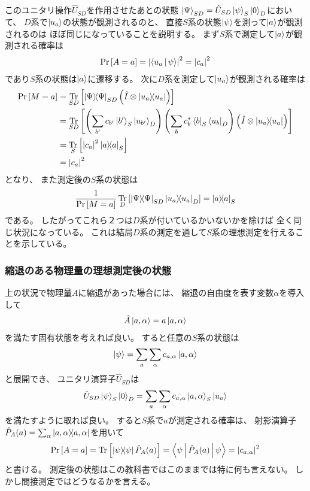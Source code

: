 \documentclass[a4paper, 10pt, uplatex]{jsarticle}
\begin{document}
このユニタリ操作$\hat{U}_{SD}$を作用させたあとの状態
$\Ket{\Psi}_{SD} = \hat{U}_{SD} \Ket{\psi}_S \Ket{0}_D$において、
$D$系で$\Ket{u_a}$の状態が観測されるのと、
直接$S$系の状態$\Ket{\psi}$を測って$\Ket{a}$が観測されるのは
ほぼ同じになっていることを説明する。
まず$S$系で測定して$\Ket{a}$が観測される確率は
\begin{align}
	\Pr \left[ A = a \right]
	= \left| \Braket{u_a | \psi} \right|^2
	= \left| c_a \right|^2
\end{align}
であり$S$系の状態は$\Ket{a}$に遷移する。
次に$D$系を測定して$\Ket{u_a}$が観測される確率は
\begin{align}
	\Pr \left[ M = a \right]
	&= \Tr_{SD} \left[ \Ketbra{\Psi}{\Psi}_{SD}
	\left( \hat{I} \otimes \Ketbra{u_a}{u_a} \right) \right] \\
	&= \Tr_{SD}
	\left[ \left( \sum_{b'} c_{b'} \Ket{b'}_S \Ket{u_{b'}}_D \right)
	\left( \sum_b c^*_b \Bra{b}_S \Bra{u_b}_D \right)
	\left( \hat{I} \otimes \Ketbra{u_a}{u_a} \right) \right] \\
	&= \Tr_S \left[ \left| c_a \right|^2 \Ketbra{a}{a}_S \right] \\
	&= \left| c_a \right|^2
\end{align}
となり、
また測定後の$S$系の状態は
\begin{align}
	\frac{1}{\Pr \left[ M = a \right]}
	\operatorname*{Tr}_D \left[ \Ket{\Psi} \! \! \Bra{\Psi}_{SD} \Ket{u_a} \! \! \Bra{u_a}_D \right]
	= \Ket{a} \! \! \Bra{a}_S
\end{align}
である。
したがってこれら２つは$D$系が付いているかいないかを除けば
全く同じ状況になっている。
これは結局$D$系の測定を通して$S$系の理想測定を行えることを示している。

\subsubsection{縮退のある物理量の理想測定後の状態}
上の状況で物理量$A$に縮退があった場合には、
縮退の自由度を表す変数$\alpha$を導入して
\begin{align}
	\hat{A} \Ket{a, \alpha} = a \Ket{a, \alpha}
\end{align}
を満たす固有状態を考えれば良い。
すると任意の$S$系の状態は
\begin{align}
	\Ket{\psi} = \sum_a \sum_\alpha c_{a, \alpha} \Ket{a, \alpha}
\end{align}
と展開でき、
ユニタリ演算子$\hat{U}_{SD}$は
\begin{align}
	\hat{U}_{SD} \Ket{\psi}_S \Ket{0}_D
	= \sum_a \sum_\alpha c_{a, \alpha} \Ket{a, \alpha}_S \Ket{u_a}
\end{align}
を満たすように取れば良い。
すると$S$系で$a$が測定される確率は、
射影演算子$\hat{P}_A (a) = \sum_\alpha \Ket{a, \alpha} \! \! \Bra{a, \alpha}$を用いて
\begin{align}
	\Pr \left[ A = a \right]
	= \operatorname*{Tr} \left[ \Ket{\psi} \! \! \Bra{\psi} \hat{P}_A (a) \right]
	= \Braket{\psi | \hat{P}_A (a) | \psi}
	= \left| c_{a, \alpha} \right|^2
\end{align}
と書ける。
測定後の状態はこの教科書ではこのままでは特に何も言えない。
しかし間接測定ではどうなるかを言える。
\end{document}
